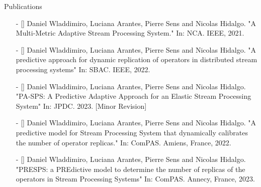 \begin{frame}{Publications}
\footnotesize

\begin{itemize}
	\item[-] [\cite{WladdimiroNCA}] Daniel Wladdimiro, Luciana Arantes, Pierre Sens and Nicolas Hidalgo. "A Multi-Metric Adaptive Stream Processing System." In: NCA. IEEE, 2021.
	\item[-] [\cite{WladdimiroSBAC}] Daniel Wladdimiro, Luciana Arantes, Pierre Sens and Nicolas Hidalgo. "A predictive approach for dynamic replication of operators in distributed stream processing systems" In: SBAC. IEEE, 2022.
	\item[-] [\cite{WladdimiroJPDC}] Daniel Wladdimiro, Luciana Arantes, Pierre Sens and Nicolas Hidalgo. "PA-SPS: A Predictive Adaptive Approach for an Elastic Stream Processing System" In: JPDC. 2023. [Minor Revision]
	\item[-] [\cite{WladdimiroComPAS2022}] Daniel Wladdimiro, Luciana Arantes, Pierre Sens and Nicolas Hidalgo. "A predictive model for Stream Processing System that dynamically calibrates the number of operator replicas." In: ComPAS. Amiens, France, 2022.
	\item[-] [\cite{WladdimiroComPAS2023}] Daniel Wladdimiro, Luciana Arantes, Pierre Sens and Nicolas Hidalgo. "PRESPS: a PREdictive model to determine the number of replicas of the operators in Stream Processing Systems" In: ComPAS. Annecy, France,
2023.
\end{itemize}
\end{frame}

